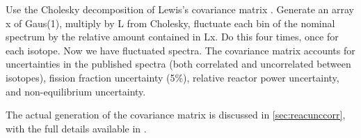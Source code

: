\documentclass[../thesis.tex]{subfiles}
\begin{document}
Use the Cholesky decomposition of Lewis's covariance matrix \cite{Lewis}. Generate an array x of Gaus(1), multiply by L from Cholesky, fluctuate each bin of the nominal spectrum by the relative amount contained in Lx. Do this four times, once for each isotope. Now we have fluctuated spectra. The covariance matrix accounts for uncertainties in the published spectra (both correlated and uncorrelated between isotopes), fission fraction uncertainty (5\%), relative reactor power uncertainty, and non-equilibrium uncertainty.

The actual generation of the covariance matrix is discussed in \autoref{sec:reacunccorr}, with the full details available in \cite{Lewis}.
\end{document}
